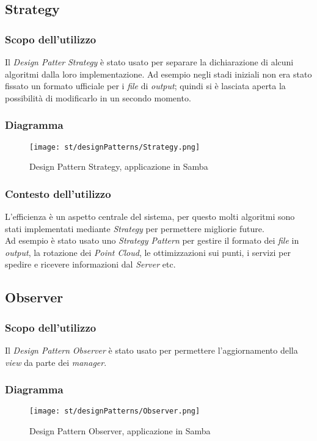 \subsection{Strategy}
\subsubsection{Scopo dell'utilizzo}
Il \emph{Design Patter} \emph{Strategy} è stato usato per separare la dichiarazione di alcuni algoritmi dalla loro implementazione. Ad esempio negli stadi iniziali non era stato fissato un formato ufficiale per i \emph{file} di \emph{output}; quindi si è lasciata aperta la possibilità di modificarlo in un secondo momento.
\subsubsection{Diagramma}
\begin{figure}[H] 
    \centering 
    \texttt{[image: st/designPatterns/Strategy.png]} 
    \caption{Design Pattern Strategy, applicazione in Samba}
\end{figure}
\subsubsection{Contesto dell'utilizzo}
L'efficienza è un aspetto centrale del sistema, per questo molti algoritmi sono stati implementati mediante \emph{Strategy} per permettere migliorie future.\\
Ad esempio è stato usato uno \emph{Strategy Pattern} per gestire il formato dei \emph{file} in \emph{output}, la rotazione dei \emph{Point Cloud}, le ottimizzazioni sui punti, i servizi per spedire e ricevere informazioni dal \emph{Server} etc.

\subsection{Observer}
\subsubsection{Scopo dell'utilizzo}
Il \emph{Design Pattern} \emph{Observer} è stato usato per permettere l'aggiornamento della \emph{view} da parte dei \emph{manager}.
\subsubsection{Diagramma}\label{dia:ObserverPattern}
\begin{figure}[H] 
    \centering 
    \texttt{[image: st/designPatterns/Observer.png]} 
    \caption{Design Pattern Observer, applicazione in Samba}
\end{figure}
